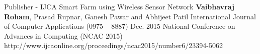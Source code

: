 


\begin{cventries}

  \cvpublicationentry
    {Publisher - IJCA} %
    {Smart Farm using Wireless Sensor Network} %
    {\textbf{Vaibhavraj Roham}, Prasad Rupnar, Ganesh Pawar and Abhijeet Patil} %
    {International Journal of Computer Applications (0975 – 8887)}
    {Dec. 2015} %
    {National Conference on Advances in Computing (NCAC 2015)}
    {http://www.ijcaonline.org/proceedings/ncac2015/number6/23394-5062}
    
\end{cventries}